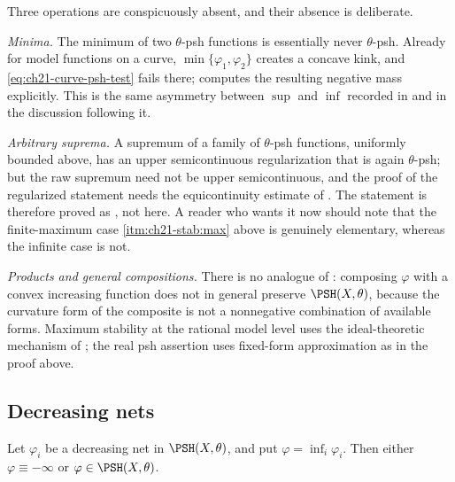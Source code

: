 \begin{remark}
\label{rem:ch21-not-stable}
Three operations are conspicuously absent, and their absence is deliberate.

\emph{Minima.}  The minimum of two $\theta$-psh functions is essentially
never $\theta$-psh.  Already for model functions on a curve,
$\min\{\varphi_1,\varphi_2\}$ creates a concave kink, and
\eqref{eq:ch21-curve-psh-test} fails there;
 computes the resulting negative mass
explicitly.  This is the same asymmetry between $\sup$ and $\inf$
recorded in  and in the discussion following it.

\emph{Arbitrary suprema.}  A supremum of a family of $\theta$-psh
functions, uniformly bounded above, has an upper semicontinuous
regularization that is again $\theta$-psh; but the raw supremum need not
be upper semicontinuous, and the proof of the regularized statement needs
the equicontinuity estimate of .  The statement
is therefore proved as , not here.  A reader
who wants it now should note that the finite-maximum case
\cref{itm:ch21-stab:max} above is genuinely elementary, whereas the infinite
case is not.

\emph{Products and general compositions.}  There is no analogue of
: composing $\varphi$ with a convex increasing
function does not in general preserve $\PSH(X,\theta)$, because the
curvature form of the composite is not a nonnegative combination of
available forms.  Maximum stability at the rational model level uses the
ideal-theoretic mechanism of ; the real psh
assertion uses fixed-form approximation as in the proof above.
\end{remark}

\subsection{Decreasing nets}
\label{sec:ch21-decreasing}

\begin{theorem}\label{thm:ch21-decreasing-stability}
Let $\varphi_i$ be a decreasing net in $\PSH(X,\theta)$, and put
$\varphi=\inf_i\varphi_i$.  Then either
$\varphi\equiv-\infty$ or $\varphi\in\PSH(X,\theta)$.
\end{theorem}

